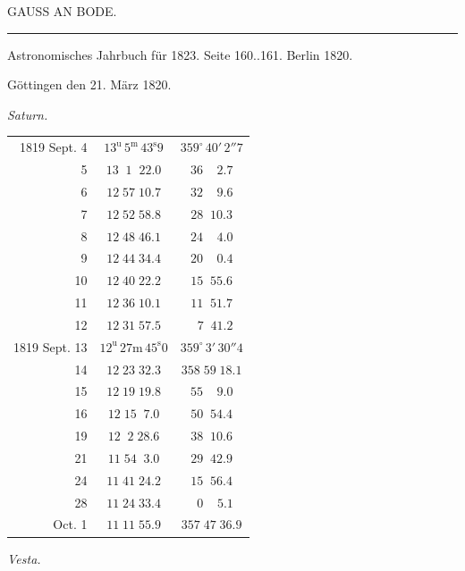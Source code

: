 \clearpage
{}
\hypertarget{native-433-part-lower}{}
\begin{center}
{\Large GAUSS AN BODE.}

\rule{0.6\linewidth}{0.4pt}

Astronomisches Jahrbuch für 1823. Seite 160..161. Berlin 1820.
\end{center}

\hfill Göttingen den 21. März 1820.

\begin{center}
\emph{Saturn.}
\end{center}

\begin{center}
\begin{tabular}{r|c|c}
1819 Sept. 4 & $13^{\mathrm u}\,5^{\mathrm m}\,43^{\mathrm s}9$ & $359^\circ\,40'\,2''7$ \\
5 & $13\;\;1\;\;22.0$ & $36\;\;\;\;2.7$ \\
6 & $12\;57\;10.7$ & $32\;\;\;\;9.6$ \\
7 & $12\;52\;58.8$ & $28\;\;10.3$ \\
8 & $12\;48\;46.1$ & $24\;\;\;\;4.0$ \\
9 & $12\;44\;34.4$ & $20\;\;\;\;0.4$ \\
10 & $12\;40\;22.2$ & $15\;\;55.6$ \\
11 & $12\;36\;10.1$ & $11\;\;51.7$ \\
12 & $12\;31\;57.5$ & $\;\;7\;\;41.2$ \\
\hline
1819 Sept. 13 & $12^{\mathrm u}\,27\mathrm{m}\,45^{\mathrm s}0$ & $359^\circ\,3'\,30''4$ \\
14 & $12\;23\;32.3$ & $358\;59\;18.1$ \\
15 & $12\;19\;19.8$ & $55\;\;\;\;9.0$ \\
16 & $12\;15\;\;7.0$ & $50\;\;54.4$ \\
19 & $12\;\;2\;28.6$ & $38\;\;10.6$ \\
21 & $11\;54\;\;3.0$ & $29\;\;42.9$ \\
24 & $11\;41\;24.2$ & $15\;\;56.4$ \\
28 & $11\;24\;33.4$ & $\;\;0\;\;\;\;5.1$ \\
Oct. 1 & $11\;11\;55.9$ & $357\;47\;36.9$ \\
\end{tabular}
\end{center}

\begin{center}
\textit{Vesta.}
\end{center}

